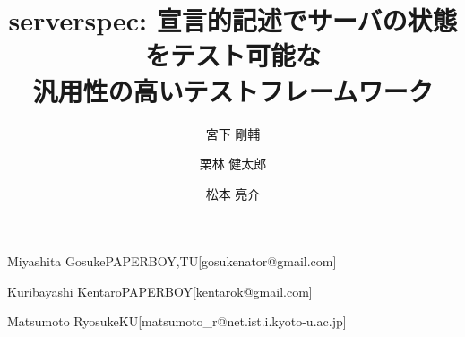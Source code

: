\documentclass[submit,techreq,noauthor]{ipsj}
\begin{document}
\title{serverspec: 宣言的記述でサーバの状態をテスト可能な\\
汎用性の高いテストフレームワーク}




\author{宮下 剛輔}{Miyashita Gosuke}{PAPERBOY,TU}[gosukenator@gmail.com]
\author{栗林 健太郎}{Kuribayashi Kentaro}{PAPERBOY}[kentarok@gmail.com]
\author{松本 亮介}{Matsumoto Ryosuke}{KU}[matsumoto\_r@net.ist.i.kyoto-u.ac.jp]



\maketitle







\begin{thebibliography}{99}


\end{thebibliography}
\end{document}
